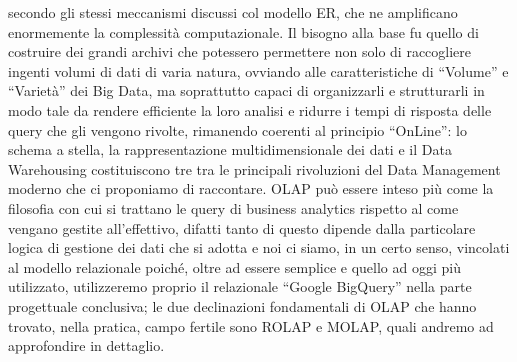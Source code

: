 \documentclass[a4paper,12pt]{report}
\begin{document}
secondo gli stessi meccanismi discussi col modello ER, che ne amplificano enormemente la complessità computazionale. Il bisogno alla base fu quello di costruire dei grandi archivi che potessero permettere non solo di raccogliere ingenti volumi di dati di varia natura, ovviando alle caratteristiche di “Volume” e “Varietà” dei Big Data, ma soprattutto capaci di organizzarli e strutturarli in modo tale da rendere efficiente la loro analisi e ridurre i tempi di risposta delle query che gli vengono rivolte, rimanendo coerenti al principio “OnLine”: lo schema a stella, la rappresentazione multidimensionale dei dati e il Data Warehousing costituiscono tre tra le principali rivoluzioni del Data Management moderno che ci proponiamo di raccontare. OLAP può essere inteso più come la filosofia con cui si trattano le query di business analytics rispetto al come vengano gestite all’effettivo, difatti tanto di questo dipende dalla particolare logica di gestione dei dati che si adotta e noi ci siamo, in un certo senso, vincolati al modello relazionale poiché, oltre ad essere semplice e quello ad oggi più utilizzato, utilizzeremo proprio il relazionale “Google BigQuery” nella parte progettuale conclusiva; le due declinazioni fondamentali di OLAP che hanno trovato, nella pratica, campo fertile sono ROLAP e MOLAP, quali andremo ad approfondire in dettaglio.
\end{document}
